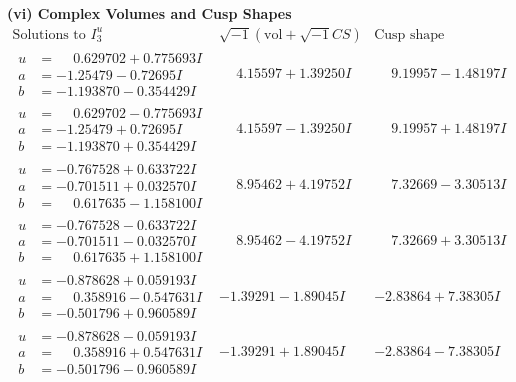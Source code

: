 \documentclass[1p]{elsarticle_modified}
\theoremstyle{definition}
\newcommand{\I}{\sqrt{-1}}
\begin{document}
\newpage\flushleft \textbf{(vi) Complex Volumes and Cusp Shapes}
$$\begin{array}{c|c|c}  
\text{Solutions to }I^u_{3}& \I (\text{vol} + \sqrt{-1}CS) & \text{Cusp shape}\\
 \hline 
\begin{aligned}
u &= \phantom{-}0.629702 + 0.775693 I \\
a &= -1.25479 - 0.72695 I \\
b &= -1.193870 - 0.354429 I\end{aligned}
 & \phantom{-}4.15597 + 1.39250 I & \phantom{-}9.19957 - 1.48197 I \\ \hline\begin{aligned}
u &= \phantom{-}0.629702 - 0.775693 I \\
a &= -1.25479 + 0.72695 I \\
b &= -1.193870 + 0.354429 I\end{aligned}
 & \phantom{-}4.15597 - 1.39250 I & \phantom{-}9.19957 + 1.48197 I \\ \hline\begin{aligned}
u &= -0.767528 + 0.633722 I \\
a &= -0.701511 + 0.032570 I \\
b &= \phantom{-}0.617635 - 1.158100 I\end{aligned}
 & \phantom{-}8.95462 + 4.19752 I & \phantom{-}7.32669 - 3.30513 I \\ \hline\begin{aligned}
u &= -0.767528 - 0.633722 I \\
a &= -0.701511 - 0.032570 I \\
b &= \phantom{-}0.617635 + 1.158100 I\end{aligned}
 & \phantom{-}8.95462 - 4.19752 I & \phantom{-}7.32669 + 3.30513 I \\ \hline\begin{aligned}
u &= -0.878628 + 0.059193 I \\
a &= \phantom{-}0.358916 - 0.547631 I \\
b &= -0.501796 + 0.960589 I\end{aligned}
 & -1.39291 - 1.89045 I & -2.83864 + 7.38305 I \\ \hline\begin{aligned}
u &= -0.878628 - 0.059193 I \\
a &= \phantom{-}0.358916 + 0.547631 I \\
b &= -0.501796 - 0.960589 I\end{aligned}
 & -1.39291 + 1.89045 I & -2.83864 - 7.38305 I \\ \hline\begin{aligned}

\end{aligned}
\end{array}$$
\end{document}
